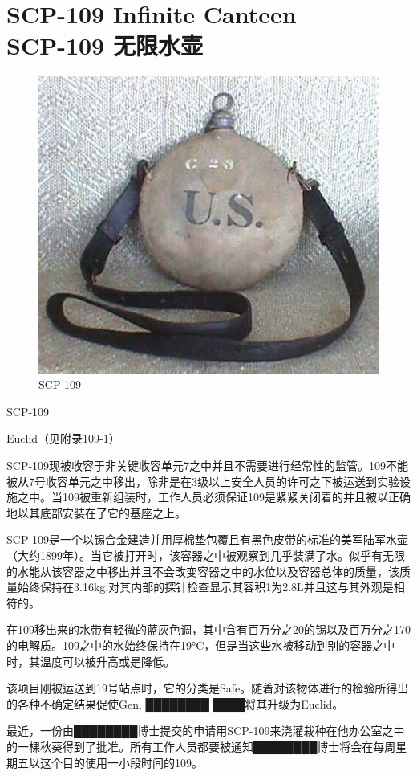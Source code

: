 \chapter[SCP-109 无限水壶]{
    SCP-109 Infinite Canteen\\
    SCP-109 无限水壶
}

\label{chap:SCP-109}

\begin{figure}[H]
    \centering
    \includegraphics[width=0.5\linewidth]{images/SCP-109.jpg}
    \caption*{SCP-109}
\end{figure}

SCP-109

Euclid（见附录109-1）

SCP-109现被收容于非关键收容单元7之中并且不需要进行经常性的监管。109不能被从7号收容单元之中移出，除非是在3级以上安全人员的许可之下被运送到实验设施之中。当109被重新组装时，工作人员必须保证109是紧紧关闭着的并且被以正确地以其底部安装在了它的基座之上。

SCP-109是一个以锡合金建造并用厚棉垫包覆且有黑色皮带的标准的美军陆军水壶（大约1899年）。当它被打开时，该容器之中被观察到几乎装满了水。似乎有无限的水能从该容器之中移出并且不会改变容器之中的水位以及容器总体的质量，该质量始终保持在3.16kg.对其内部的探针检查显示其容积1为2.8L并且这与其外观是相符的。

在109移出来的水带有轻微的蓝灰色调，其中含有百万分之20的锡以及百万分之170的电解质。109之中的水始终保持在19°C，但是当这些水被移动到别的容器之中时，其温度可以被升高或是降低。

该项目刚被运送到19号站点时，它的分类是Safe。随着对该物体进行的检验所得出的各种不确定结果促使Gen. ████████ ████将其升级为Euclid。

最近，一份由████████博士提交的申请用SCP-109来浇灌栽种在他办公室之中的一棵秋葵得到了批准。所有工作人员都要被通知████████博士将会在每周星期五以这个目的使用一小段时间的109。

